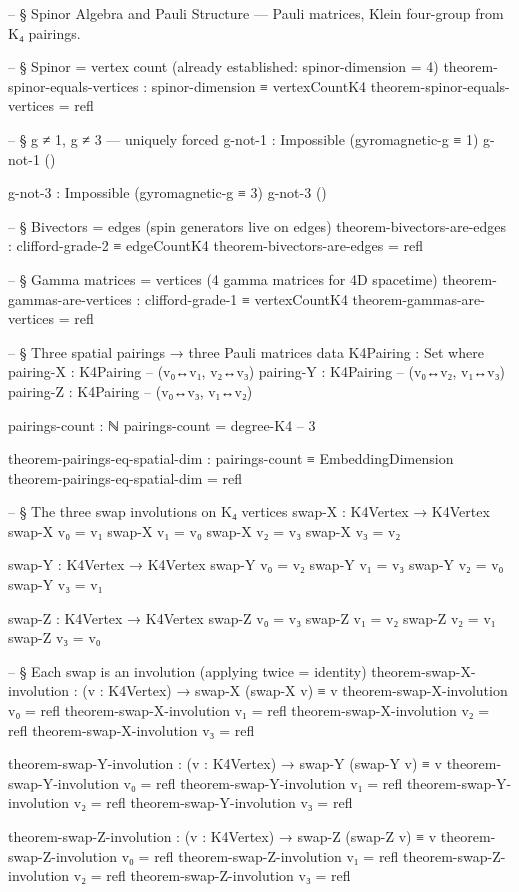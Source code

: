 \documentclass[11pt,a4paper]{book}
\begin{document}
\begin{code}
-- § Spinor Algebra and Pauli Structure — Pauli matrices, Klein four-group from K₄ pairings.

-- § Spinor = vertex count (already established: spinor-dimension = 4)
theorem-spinor-equals-vertices : spinor-dimension ≡ vertexCountK4
theorem-spinor-equals-vertices = refl

-- § g ≠ 1, g ≠ 3 — uniquely forced
g-not-1 : Impossible (gyromagnetic-g ≡ 1)
g-not-1 ()

g-not-3 : Impossible (gyromagnetic-g ≡ 3)
g-not-3 ()

-- § Bivectors = edges (spin generators live on edges)
theorem-bivectors-are-edges : clifford-grade-2 ≡ edgeCountK4
theorem-bivectors-are-edges = refl

-- § Gamma matrices = vertices (4 gamma matrices for 4D spacetime)
theorem-gammas-are-vertices : clifford-grade-1 ≡ vertexCountK4
theorem-gammas-are-vertices = refl

-- § Three spatial pairings → three Pauli matrices
data K4Pairing : Set where
  pairing-X : K4Pairing  -- (v₀↔v₁, v₂↔v₃)
  pairing-Y : K4Pairing  -- (v₀↔v₂, v₁↔v₃)
  pairing-Z : K4Pairing  -- (v₀↔v₃, v₁↔v₂)

pairings-count : ℕ
pairings-count = degree-K4  -- 3

theorem-pairings-eq-spatial-dim : pairings-count ≡ EmbeddingDimension
theorem-pairings-eq-spatial-dim = refl

-- § The three swap involutions on K₄ vertices
swap-X : K4Vertex → K4Vertex
swap-X v₀ = v₁
swap-X v₁ = v₀
swap-X v₂ = v₃
swap-X v₃ = v₂

swap-Y : K4Vertex → K4Vertex
swap-Y v₀ = v₂
swap-Y v₁ = v₃
swap-Y v₂ = v₀
swap-Y v₃ = v₁

swap-Z : K4Vertex → K4Vertex
swap-Z v₀ = v₃
swap-Z v₁ = v₂
swap-Z v₂ = v₁
swap-Z v₃ = v₀

-- § Each swap is an involution (applying twice = identity)
theorem-swap-X-involution : (v : K4Vertex) → swap-X (swap-X v) ≡ v
theorem-swap-X-involution v₀ = refl
theorem-swap-X-involution v₁ = refl
theorem-swap-X-involution v₂ = refl
theorem-swap-X-involution v₃ = refl

theorem-swap-Y-involution : (v : K4Vertex) → swap-Y (swap-Y v) ≡ v
theorem-swap-Y-involution v₀ = refl
theorem-swap-Y-involution v₁ = refl
theorem-swap-Y-involution v₂ = refl
theorem-swap-Y-involution v₃ = refl

theorem-swap-Z-involution : (v : K4Vertex) → swap-Z (swap-Z v) ≡ v
theorem-swap-Z-involution v₀ = refl
theorem-swap-Z-involution v₁ = refl
theorem-swap-Z-involution v₂ = refl
theorem-swap-Z-involution v₃ = refl


\end{code}
\end{document}
